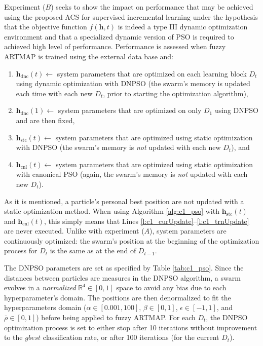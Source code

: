 Experiment ($B$) seeks to show the impact on performance that may be achieved using the proposed ACS for supervised incremental learning under the hypothesis that the objective function $f(\textbf{h},t)$ is indeed a type III dynamic optimization environment and that a specialized dynamic version of PSO is required to achieved high level of performance. Performance is assessed when fuzzy ARTMAP is trained using the external data base and:
\begin{enumerate}
	\item $\textbf{h}_\text{dnc}(t) \leftarrow$ system parameters that are optimized on each learning block $D_t$ using dynamic optimization with DNPSO (the swarm's memory is updated each time with each new $D_t$, prior to starting the optimization algorithm),
	\item $\textbf{h}_\text{dnc}(1) \leftarrow$ system parameters that are
			  optimized on only $D_1$ using DNPSO and are then fixed,
	\item $\textbf{h}_\text{stc}(t) \leftarrow$ system parameters that are
				optimized  using static optimization with DNPSO (the swarm's memory is
				\emph{not} updated with each new $D_t$), and
	\item $\textbf{h}_\text{cnl}(t) \leftarrow$ system parameters that are
				optimized using static optimization with canonical PSO (again, the
				swarm's memory is \emph{not} updated with each new $D_t$).
\end{enumerate}
As it is mentioned, a particle's personal best position are not updated with a static optimization method. When using Algorithm \ref{alg:c1_pso} with $\textbf{h}_\text{stc}(t)$ and $\textbf{h}_\text{cnl}(t)$, this simply means that Lines \ref{l:c1_curUpdate}--\ref{l:c1_trnUpdate} are never executed. Unlike with experiment ($A$), system parameters are continuously optimized: the swarm's position at the beginning of the optimization process for $D_t$ is the same as at the end of $D_{t-1}$.

The DNPSO parameters are set as specified by Table \ref{tab:c1_pso}. Since the distances between particles are measures in the DNPSO algorithm, a swarm evolves in a \emph{normalized} $\mathbb{R}^4\in[0,1]$ space to avoid any bias due to each hyperparameter's domain. The positions are then denormalized to fit the hyperparameters domain ($\alpha \in \left[0.001,100\right]$, $\beta \in \left[0,1\right]$, $\epsilon \in \left[-1,1\right]$, and $\bar{\rho} \in \left[0,1\right]$) before being applied to fuzzy ARTMAP. For each $D_t$, the DNPSO optimization process is set to either stop after 10 iterations without improvement to the $gbest$ classification rate, or after 100 iterations (for the current $D_t$).

